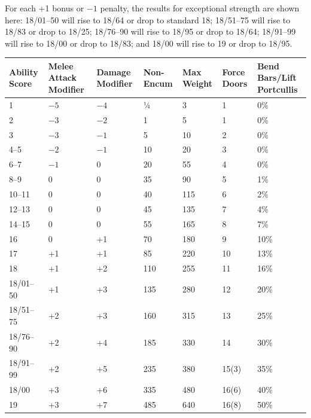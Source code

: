 \begin{multicols}{2}
For each +1 bonus or $-1$ penalty, the results for exceptional strength are shown here:
18/01--50 will rise to 18/64 or drop to standard 18; 18/51--75 will rise to 18/83 or drop to 18/25; 18/76--90 will rise to 18/95 or drop to 18/64; 18/91--99 will rise to 18/00 or drop to 18/83; and 18/00 will rise to 19 or drop to 18/95. 

\end{multicols}

\noindent
\begin{minipage}{\columnwidth}

\label{strengthscores}
\noindent
\begin{tabular}{|m{}|m{}|m{}|m{}|m{}|m{}|m{}|}
\hline
Ability Score &	Melee Attack Modifier &	Damage Modifier	& Non-Encum	& Max Weight	& Force Doors &	Bend Bars/Lift Portcullis \\
\hline\hline
\rowcolor[gray]{.9}1		& $-5$	& $-4$	& ¼ 	& 3		& 1		& 0\% \\
2		& $-3$	& $-2$	& 1		& 5		& 1		& 0\% \\
\rowcolor[gray]{.9}3		& $-3$	& $-1$	& 5		& 10	& 2		& 0\% \\
4--5		& $-2$	& $-1$	& 10	& 20	& 3		& 0\% \\
\rowcolor[gray]{.9}6--7		& $-1$	& 0		& 20	& 55	& 4		& 0\% \\
8--9		& 0		& 0		& 35	& 90	& 5		& 1\% \\
\rowcolor[gray]{.9}10--11	& 0		& 0		& 40	& 115	& 6		& 2\% \\
12--13	& 0		& 0		& 45	& 135	& 7		& 4\% \\
\rowcolor[gray]{.9}14--15	& 0		& 0		& 55	& 165	& 8		& 7\% \\
16		& 0		& +1	& 70	& 180	& 9		& 10\% \\
\rowcolor[gray]{.9}17		& +1	& +1	& 85	& 220	& 10	& 13\% \\
18		& +1	& +2	& 110	& 255	& 11	& 16\% \\
\rowcolor[gray]{.9}18/01--50	& +1	& +3	& 135	& 280	& 12	& 20\% \\
18/51--75	& +2	& +3	& 160	& 315	& 13	& 25\% \\
\rowcolor[gray]{.9}18/76--90	& +2	& +4	& 185	& 330	& 14	& 30\% \\
18/91--99	& +2	& +5	& 235	& 380	& 15(3)	& 35\% \\
\rowcolor[gray]{.9}18/00	& +3	& +6	& 335	& 480	& 16(6)		& 40\% \\
19		& +3	& +7	& 485	& 640	& 16(8)		& 50\% \\

\end{tabular}
\end{minipage}
